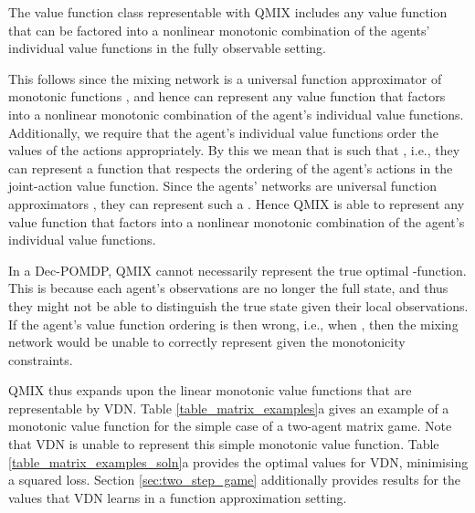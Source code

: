 \documentclass[twoside,11pt]{article}
\renewcommand{\cite}{\citep}
\begin{document}
The value function class representable with QMIX includes any value function that can be factored into a nonlinear monotonic combination of the agents' individual value functions in the fully observable setting. 

This follows since the mixing network is a universal function approximator of monotonic functions \cite{Dugas_2009}, and hence can represent any value function that factors into a nonlinear monotonic combination of the agent's individual value functions. Additionally, we require that the agent's individual value functions order the values of the actions appropriately. By this we mean that  is such that , i.e., they can represent a function that respects the ordering of the agent's actions in the joint-action value function. Since the agents' networks are universal function approximators \cite{pinkus1999approximation}, they can represent such a . Hence QMIX is able to represent any value function that factors into a nonlinear monotonic combination of the agent's individual value functions. 

In a Dec-POMDP, QMIX cannot necessarily represent the true optimal -function. 
This is because each agent's observations are no longer the full state, and thus they might not be able to distinguish the true state given their local observations. If the agent's value function ordering is then wrong, i.e.,  when , then the mixing network would be unable to correctly represent  given the monotonicity constraints. 

QMIX thus expands upon the linear monotonic value functions that are representable by VDN. Table \ref{table_matrix_examples}a gives an example of a monotonic value function for the simple case of a two-agent matrix game. 
Note that VDN is unable to represent this simple monotonic value function.
Table \ref{table_matrix_examples_soln}a provides the optimal  values for VDN, minimising a squared loss. Section \ref{sec:two_step_game} additionally provides results for the values that VDN learns in a function approximation setting.
\end{document}
